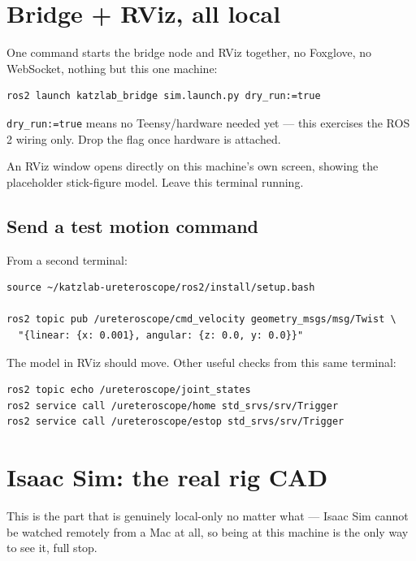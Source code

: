 \documentclass[11pt]{article}
\begin{document}
\section{Bridge + RViz, all local}

One command starts the bridge node and RViz together, no Foxglove, no
WebSocket, nothing but this one machine:

\begin{lstlisting}
ros2 launch katzlab_bridge sim.launch.py dry_run:=true
\end{lstlisting}

\texttt{dry\_run:=true} means no Teensy/hardware needed yet --- this
exercises the ROS 2 wiring only. Drop the flag once hardware is attached.

An RViz window opens directly on this machine's own screen, showing the
placeholder stick-figure model. Leave this terminal running.

\subsection{Send a test motion command}
From a second terminal:

\begin{lstlisting}
source ~/katzlab-ureteroscope/ros2/install/setup.bash

ros2 topic pub /ureteroscope/cmd_velocity geometry_msgs/msg/Twist \
  "{linear: {x: 0.001}, angular: {z: 0.0, y: 0.0}}"
\end{lstlisting}

The model in RViz should move. Other useful checks from this same
terminal:

\begin{lstlisting}
ros2 topic echo /ureteroscope/joint_states
ros2 service call /ureteroscope/home std_srvs/srv/Trigger
ros2 service call /ureteroscope/estop std_srvs/srv/Trigger
\end{lstlisting}

\section{Isaac Sim: the real rig CAD}

This is the part that is genuinely local-only no matter what --- Isaac
Sim cannot be watched remotely from a Mac at all, so being at this
machine is the only way to see it, full stop.
\end{document}
